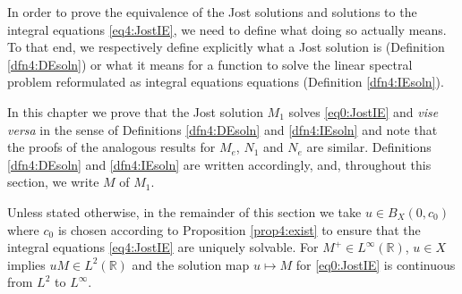 \documentclass[../dissertation.tex]{subfiles}
\begin{document}

In order to prove the equivalence of the Jost solutions and solutions to the 
integral equations \eqref{eq4:JostIE}, we need to define what doing so actually
means. To that end, we respectively define explicitly what a Jost solution is 
(Definition \ref{dfn4:DEsoln}) or what it means for a function to solve the 
linear spectral problem reformulated as integral equations equations (Definition 
\ref{dfn4:IEsoln}).

\begin{rmk}\label{rmk3:wlog}
	In this chapter we prove that the Jost solution $M_1$ 
	solves \eqref{eq0:JostIE} and \textit{vise versa} in the sense
	of Definitions \ref{dfn4:DEsoln} and \ref{dfn4:IEsoln} and note
	that the proofs of the analogous results for $M_e$, $N_1$ and $N_e$
	are similar. Definitions \ref{dfn4:DEsoln} and \ref{dfn4:IEsoln}
	are written accordingly, and, throughout this section, we write $M$ 
	 of $M_1$. 
\end{rmk}

Unless stated otherwise, in the remainder of this section we take 
$u \in B_X(0, c_0)$ where $c_0$ is chosen according to Proposition 
\ref{prop4:exist} to ensure that the integral equations \eqref{eq4:JostIE}
are uniquely solvable. For 
$M^+ \in L^\infty(\mathbb R)$,
$u \in X$ implies $uM \in L^2(\mathbb R)$ and the solution map $u\mapsto M$
for \eqref{eq0:JostIE} is continuous from $L^2$ to $L^\infty$.
\end{document}
